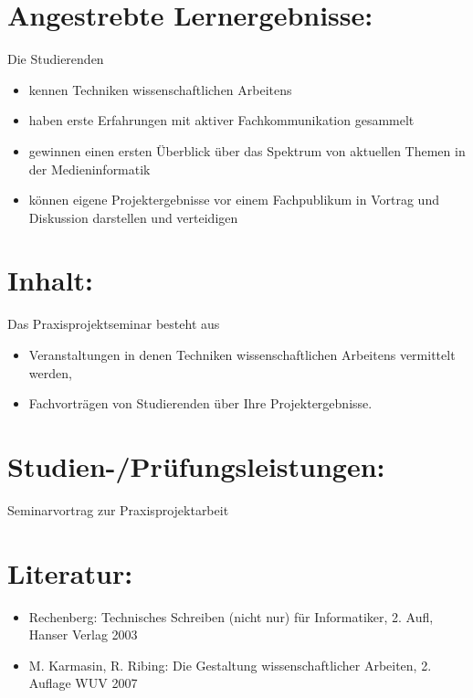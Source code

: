 \section*{Angestrebte
Lernergebnisse:}\label{angestrebte-lernergebnisse-19}

Die Studierenden

\begin{itemize}
\tightlist
\item
  kennen Techniken wissenschaftlichen Arbeitens
\item
  haben erste Erfahrungen mit aktiver Fachkommunikation gesammelt
\item
  gewinnen einen ersten Überblick über das Spektrum von aktuellen Themen
  in der Medieninformatik
\item
  können eigene Projektergebnisse vor einem Fachpublikum in Vortrag und
  Diskussion darstellen und verteidigen
\end{itemize}

\section*{Inhalt:}\label{inhalt-19}

Das Praxisprojektseminar besteht aus

\begin{itemize}
\tightlist
\item
  Veranstaltungen in denen Techniken wissenschaftlichen Arbeitens
  vermittelt werden,
\item
  Fachvorträgen von Studierenden über Ihre Projektergebnisse.
\end{itemize}

\section*{Studien-/Prüfungsleistungen:}\label{studien-pruxfcfungsleistungen-17}

Seminarvortrag zur Praxisprojektarbeit

\section*{Literatur:}\label{literatur-15}

\begin{itemize}
\tightlist
\item
  Rechenberg: Technisches Schreiben (nicht nur) für Informatiker, 2.
  Aufl, Hanser Verlag 2003
\item
  M. Karmasin, R. Ribing: Die Gestaltung wissenschaftlicher Arbeiten, 2.
  Auflage WUV 2007
\end{itemize}

